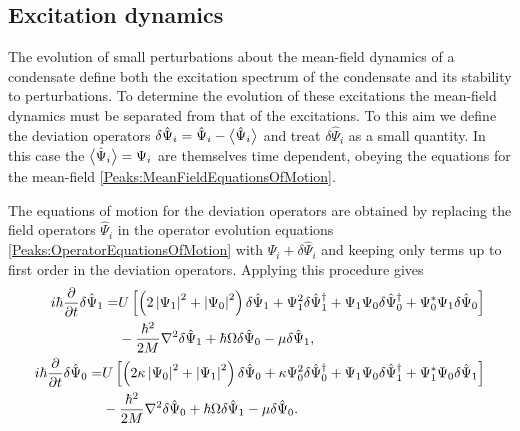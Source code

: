 \begin{figure}
{     \label{Peaks:BlochSphere}}
\end{figure}

\subsection{Excitation dynamics}

The evolution of small perturbations about the mean-field dynamics of a condensate define both the excitation spectrum of the condensate and its stability to perturbations. 
To determine the evolution of these excitations the mean-field dynamics must be separated from that of the excitations. To this aim we define the deviation operators $\delta\hat{\Psi}_i = \hat{\Psi}_i - {\big<\hat{\Psi}_i\big>}$ and treat $\delta\hat{\Psi}_i$ as a small quantity. In this case the ${\big<\hat{\Psi}_i\big>}=\Psi_i$ are themselves time dependent, obeying the equations for the mean-field \eqref{Peaks:MeanFieldEquationsOfMotion}.

The equations of motion for the deviation operators are obtained by replacing the field operators $\hat{\Psi}_i$ in the operator evolution equations \eqref{Peaks:OperatorEquationsOfMotion} with $\Psi_i + \delta \hat{\Psi}_i$ and keeping only terms up to first order in the deviation operators. Applying this procedure gives
\begin{subequations}
    \label{Peaks:DeviationOperatorsEvolutionXSpace}
    \begin{align}
        \begin{split}
            i \hbar \frac{\partial }{\partial t}\delta \hat{\Psi}_1 =& U\left[ \left(2\abs{\Psi_1}^2+\abs{\Psi_0}^2 \right)\delta \hat{\Psi}_1 + \Psi_1^2\delta\hat{\Psi}_1^\dagger + \Psi_1\Psi_0\delta\hat{\Psi}_0^\dagger + \Psi_0^*\Psi_1\delta\hat{\Psi}_0\right]\\
                    & - \frac{\hbar^2}{2M}\nabla^2 \delta \hat{\Psi}_1 +\hbar \Omega\delta\hat{\Psi}_0- \mu \delta \hat{\Psi}_1,
        \end{split}\\
        \begin{split}
        i \hbar \frac{\partial }{\partial t}\delta \hat{\Psi}_0 =& U\left[\left(2\kappa \abs{\Psi_0}^2 +\abs{\Psi_1}^2\right)\delta\hat{\Psi}_0 + \kappa \Psi_0^2 \delta\hat{\Psi}_0^\dagger + \Psi_1\Psi_0\delta\hat{\Psi}_1^\dagger + \Psi_1^*\Psi_0\delta\hat{\Psi}_1\right]\\
                    & -\frac{\hbar^2}{2M}\nabla^2 \delta \hat{\Psi}_0 +\hbar \Omega\delta\hat{\Psi}_1 - \mu \delta\hat{\Psi}_0.
        \end{split}
    \end{align}
\end{subequations}

